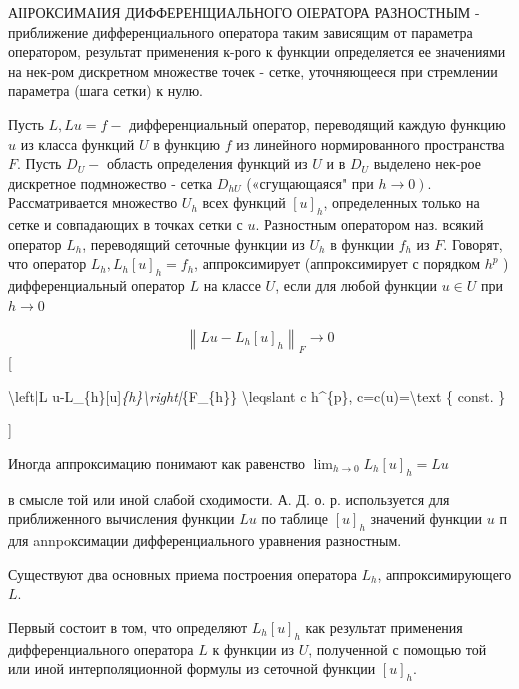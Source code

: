 \documentclass[10pt]{article}
\begin{document}
АІІРОКСИМАІИЯ ДИФФЕРЕНЩИАЛЬНОГО ОIЕРАТОРА РАЗНОСТНЫМ - приближение дифференциального оператора таким зависящим от параметра оператором, результат применения к-рого к функции определяется ее значениями на нек-ром дискретном множестве точек - сетке, уточняющееся при стремлении параметра (шага сетки) к нулю.



Пусть $L, L u=f-$ дифференциальный оператор, переводящий каждую функцию $u$ из класса функций $U$ в функцию $f$ из линейного нормированного пространства $F$. Пусть $D_{U}-$ область определения функций из $U$ и в $D_{U}$ выделено нек-рое дискретное подмножество - сетка $D_{h U}$ («сгущающаяся" при $\left.h \rightarrow 0\right)$. Рассматривается множество $U_{h}$ всех функций $[u]_{h}$, определенных только на сетке и совпадающих в точках сетки с $u$. Разностным оператором наз. всякий оператор $L_{h}$, переводящий сеточные функции из $U_{h}$ в функции $f_{h}$ из $F$. Говорят, что оператор $L_{h}, L_{h}[u]_{h}=f_{h}$, аппроксимирует (аппроксимирует с порядком $h^{p}$ ) дифференциальный оператор $L$ на классе $U$, если для любой функции $u \in U$ при $h \rightarrow 0$



\[

\left\|L u-L_{h}[u]_{h}\right\|_{F} \longrightarrow 0

\][



\textbackslash left|L u-L\_\{h\}[u]\textit{\{h\}\textbackslash right|}\{F\_\{h\}\} \textbackslash leqslant c h\^{}\{p\}, c=c(u)=\textbackslash text \{ const. \}

]



Иногда аппроксимацию понимают как равенство $\lim _{h \rightarrow 0} L_{h}[u]_{h}=L u$



в смысле той или иной слабой сходимости. А. Д. о. р. используется для приближенного вычисления функции $L u$ по таблице $[u]_{h}$ значений функции $u$ п для annpoксимации дифференциального уравнения разностным.



Существуют два основных приема построения оператора $L_{h}$, аппроксимирующего $L$.



Первый состоит в том, что определяют $L_{h}[u]_{h}$ как результат применения дифференциального оператора $L$ к функции из $U$, полученной с помощью той или иной интерполяционной формулы из сеточной функции $[u]_{h}$.
\end{document}
